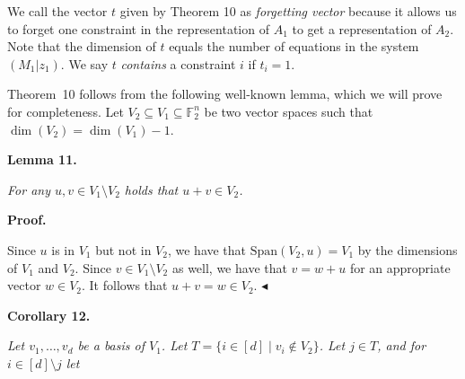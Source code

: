 


We call the vector $t$ given by Theorem 10 as \emph{forgetting vector} because it allows us to forget one constraint in the representation of $A_{1}$ to get a representation of $A_{2}$.
Note that the dimension of $t$ equals the number of equations in the system $(M_{1}|z_{1})$.
We say $t$ \emph{contains} a constraint $i$ if $t_{i}=1$.\par




Theorem 10 follows from the following well-known lemma, which we will prove for completeness.
Let $V_{2}\subseteq V_{1}\subseteq\mathbb{F}_{2}^{n}$ be two vector spaces such that $\dim(V_{2})=\dim(V_{1})-1$.\par





\par\medskip\noindent\textbf{
\textbf{Lemma 11}\textbf{.}
}\par



\emph{For any $u,v\in V_{1}\setminus V_{2}$ holds that $u+v\in V_{2}$.}\par






\par\medskip\noindent\textbf{Proof.}\par




Since $u$ is in $V_{1}$ but not in $V_{2}$, we have that $\text{Span}(V_{2},u)=V_{1}$ by the dimensions of $V_{1}$ and $V_{2}$.
Since $v\in V_{1}\setminus V_{2}$ as well, we have that $v=w+u$ for an appropriate vector $w\in V_{2}$.
It follows that $u+v=w\in V_{2}$.
$\blacktriangleleft$\par





\par\medskip\noindent\textbf{
\textbf{Corollary 12}\textbf{.}
}\par



\emph{Let $v_{1},\dots,v_{d}$ be a basis of $V_{1}$.
Let $T=\{i\in[d]\mid v_{i}\not\in V_{2}\}$.
Let $j\in T$, and for $i\in[d]\setminus j$ let}\par


